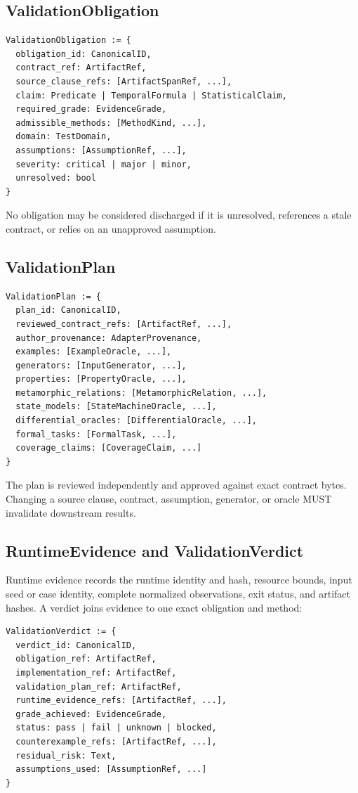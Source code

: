 \documentclass[10pt]{article}
\begin{document}
\subsection{ValidationObligation}

\begin{lstlisting}
ValidationObligation := {
  obligation_id: CanonicalID,
  contract_ref: ArtifactRef,
  source_clause_refs: [ArtifactSpanRef, ...],
  claim: Predicate | TemporalFormula | StatisticalClaim,
  required_grade: EvidenceGrade,
  admissible_methods: [MethodKind, ...],
  domain: TestDomain,
  assumptions: [AssumptionRef, ...],
  severity: critical | major | minor,
  unresolved: bool
}
\end{lstlisting}

No obligation may be considered discharged if it is unresolved, references a
stale contract, or relies on an unapproved assumption.

\subsection{ValidationPlan}

\begin{lstlisting}
ValidationPlan := {
  plan_id: CanonicalID,
  reviewed_contract_refs: [ArtifactRef, ...],
  author_provenance: AdapterProvenance,
  examples: [ExampleOracle, ...],
  generators: [InputGenerator, ...],
  properties: [PropertyOracle, ...],
  metamorphic_relations: [MetamorphicRelation, ...],
  state_models: [StateMachineOracle, ...],
  differential_oracles: [DifferentialOracle, ...],
  formal_tasks: [FormalTask, ...],
  coverage_claims: [CoverageClaim, ...]
}
\end{lstlisting}

The plan is reviewed independently and approved against exact contract bytes.
Changing a source clause, contract, assumption, generator, or oracle MUST
invalidate downstream results.

\subsection{RuntimeEvidence and ValidationVerdict}

Runtime evidence records the runtime identity and hash, resource bounds, input
seed or case identity, complete normalized observations, exit status, and
artifact hashes.  A verdict joins evidence to one exact obligation and method:

\begin{lstlisting}
ValidationVerdict := {
  verdict_id: CanonicalID,
  obligation_ref: ArtifactRef,
  implementation_ref: ArtifactRef,
  validation_plan_ref: ArtifactRef,
  runtime_evidence_refs: [ArtifactRef, ...],
  grade_achieved: EvidenceGrade,
  status: pass | fail | unknown | blocked,
  counterexample_refs: [ArtifactRef, ...],
  residual_risk: Text,
  assumptions_used: [AssumptionRef, ...]
}
\end{lstlisting}
\end{document}
